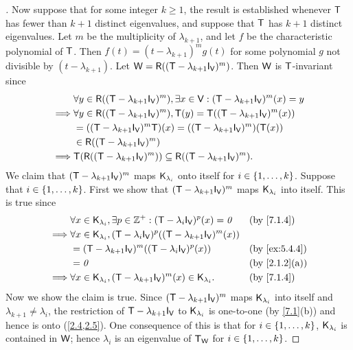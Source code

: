 \begin{proof}[]
  Now suppose that for some integer \(k \geq 1\), the result is established whenever \(\mathsf{T}\) has fewer than \(k + 1\) distinct eigenvalues, and suppose that \(\mathsf{T}\) has \(k + 1\) distinct eigenvalues.
  Let \(m\) be the multiplicity of \(\lambda_{k + 1}\), and let \(f\) be the characteristic polynomial of \(\mathsf{T}\).
  Then \(f(t) = (t - \lambda_{k + 1})^m g(t)\) for some polynomial \(g\) not divisible by \((t - \lambda_{k + 1})\).
  Let \(\W = \rg{(\T - \lambda_{k + 1} \IT[\V])^m}\).
  Then \(\mathsf{W}\) is \(\mathsf{T}\)-invariant since
  \begin{align*}
             & \forall y \in \rg{(\T - \lambda_{k + 1} \IT[\V])^m}, \exists x \in \V : (\T - \lambda_{k + 1} \IT[\V])^m(x) = y \\
    \implies & \forall y \in \rg{(\T - \lambda_{k + 1} \IT[\V])^m}, \T(y) = \T ((\T - \lambda_{k + 1} \IT[\V])^m(x))           \\
             & = ((\T - \lambda_{k + 1} \IT[\V])^m \T)(x) = ((\T - \lambda_{k + 1} \IT[\V])^m)(\T(x))                          \\
             & \in \rg{(\T - \lambda_{k + 1} \IT[\V])^m}                                                                       \\
    \implies & \T(\rg{(\T - \lambda_{k + 1} \IT[\V])^m}) \subseteq \rg{(\T - \lambda_{k + 1} \IT[\V])^m}.
  \end{align*}
  We claim that \((\T - \lambda_{k + 1} \IT[\V])^m\) maps \(\mathsf{K}_{\lambda_i}\) onto itself for \(i \in \left\lbrace1, \dots, k\right\rbrace\).
  Suppose that \(i \in \left\lbrace1, \dots, k\right\rbrace\).
  First we show that \((\T - \lambda_{k + 1} \IT[\V])^m\) maps \(\mathsf{K}_{\lambda_i}\) into itself.
  This is true since
  \begin{align*}
             & \forall x \in \vs{K}_{\lambda_i}, \exists p \in \Z^+ : (\T - \lambda_i \IT[\V])^p(x) = \zv        &  & \by{7.1.4}    \\
    \implies & \forall x \in \vs{K}_{\lambda_i}, (\T - \lambda_i \IT[\V])^p((\T - \lambda_{k + 1} \IT[\V])^m(x))                    \\
             & = (\T - \lambda_{k + 1} \IT[\V])^m((\T - \lambda_i \IT[\V])^p(x))                                 &  & \by{ex:5.4.4} \\
             & = \zv                                                                                             &  & \by{2.1.2}[a] \\
    \implies & \forall x \in \vs{K}_{\lambda_i}, (\T - \lambda_{k + 1} \IT[\V])^m(x) \in \vs{K}_{\lambda_i}.     &  & \by{7.1.4}
  \end{align*}
  Now we show the claim is true.
  Since \((\T - \lambda_{k + 1} \IT[\V])^m\) maps \(\mathsf{K}_{\lambda_i}\) into itself and \(\lambda_{k + 1} \neq \lambda_i\), the restriction of \(\T - \lambda_{k + 1} \IT[\V]\) to \(\mathsf{K}_{\lambda_i}\) is one-to-one (by \cref{7.1}(b)) and hence is onto (\cref{2.4,2.5}).
  One consequence of this is that for \(i \in \left\lbrace1, \dots, k\right\rbrace\), \(\mathsf{K}_{\lambda_i}\) is contained in \(\mathsf{W}\);
  hence \(\lambda_i\) is an eigenvalue of \(\mathsf{T}_{\mathsf{W}}\) for \(i \in \left\lbrace1, \dots, k\right\rbrace\).


\end{proof}
